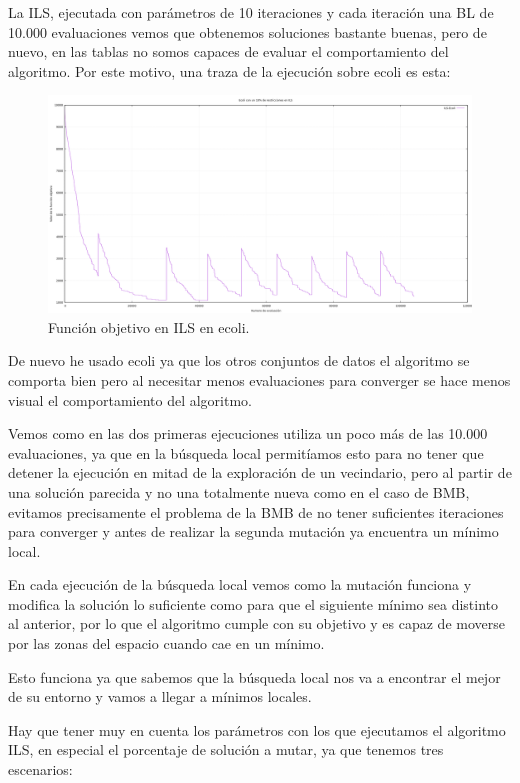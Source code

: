 \documentclass[12pt, spanish]{article}
\begin{document}
La ILS, ejecutada con parámetros de 10 iteraciones y cada iteración una BL de 10.000 evaluaciones vemos que obtenemos soluciones bastante buenas, pero de nuevo, en las tablas no somos capaces de evaluar el comportamiento del algoritmo. Por este motivo, una traza de la ejecución sobre ecoli es esta:

\begin{figure}[H]
	\centering
	\includegraphics[scale = 0.35]{ecoli-ils.png}
	
	\caption{Función objetivo en ILS en ecoli.}
	\label{fig:ils-cmp1}
\end{figure}

De nuevo he usado ecoli ya que los otros conjuntos de datos el algoritmo se comporta bien pero al necesitar menos evaluaciones para converger se hace menos visual el comportamiento del algoritmo.

Vemos como en las dos primeras ejecuciones utiliza un poco más de las 10.000 evaluaciones, ya que en la búsqueda local permitíamos esto para no tener que detener la ejecución en mitad de la exploración de un vecindario, pero al partir de una solución parecida y no una totalmente nueva como en el caso de BMB, evitamos precisamente el problema de la BMB de no tener suficientes iteraciones para converger y antes de realizar la segunda mutación ya encuentra un mínimo local.

En cada ejecución de la búsqueda local vemos como la mutación funciona y modifica la solución lo suficiente como para que el siguiente mínimo sea distinto al anterior, por lo que el algoritmo cumple con su objetivo y es capaz de moverse por las zonas del espacio cuando cae en un mínimo.

Esto funciona ya que sabemos que la búsqueda local nos va a encontrar el mejor de su entorno y vamos a llegar a mínimos locales. 

Hay que tener muy en cuenta los parámetros con los que ejecutamos el algoritmo ILS, en especial el porcentaje de solución a mutar, ya que tenemos tres escenarios:
\end{document}
